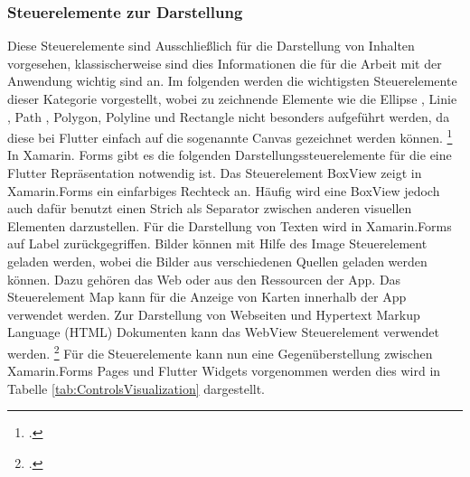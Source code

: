 \subsubsection{Steuerelemente zur Darstellung}
Diese Steuerelemente sind Ausschließlich für die Darstellung von Inhalten vorgesehen,  klassischerweise sind dies Informationen die für die Arbeit mit der Anwendung wichtig sind an.  Im folgenden werden die wichtigsten Steuerelemente dieser Kategorie vorgestellt,  wobei zu zeichnende Elemente wie die \glq Ellipse\grq{} ,  \glq Linie\grq{} , \glq Path\grq{} ,  \glq Polygon,\grq{}   \glq Polyline\grq{}  und \glq Rectangle\grq{}  nicht besonders aufgeführt werden,  da diese bei Flutter einfach auf die sogenannte Canvas gezeichnet werden können.  \footcite[Vgl.][Abgerufen am \today]{GoogleFlutterCanvas2020} In Xamarin. Forms gibt es die folgenden Darstellungssteuerelemente für die eine Flutter Repräsentation notwendig ist.  Das Steuerelement \glq BoxView zeigt in Xamarin.Forms ein einfarbiges Rechteck an. Häufig wird eine \glq BoxView\grq{}  jedoch auch dafür benutzt einen Strich als Separator zwischen anderen visuellen Elementen darzustellen.  Für die Darstellung von Texten wird in Xamarin.Forms auf \glq Label\grq{} zurückgegriffen. Bilder können mit Hilfe des \glq Image\grq{}  Steuerelement geladen werden,  wobei die Bilder aus verschiedenen Quellen geladen werden können.  Dazu gehören das Web oder aus den Ressourcen der App.  Das Steuerelement \glq Map\grq{}  kann für die Anzeige von Karten innerhalb der App verwendet werden.  Zur Darstellung von Webseiten und Hypertext Markup Language (HTML) Dokumenten kann das \glq WebView\grq{}  Steuerelement verwendet werden.  \footcite[Vgl.][Abgerufen am \today]{MicrosoftXamLayouts2018} Für die Steuerelemente kann nun eine Gegenüberstellung zwischen Xamarin.Forms Pages und Flutter Widgets vorgenommen werden dies wird in Tabelle \ref{tab:ControlsVisualization} dargestellt.


